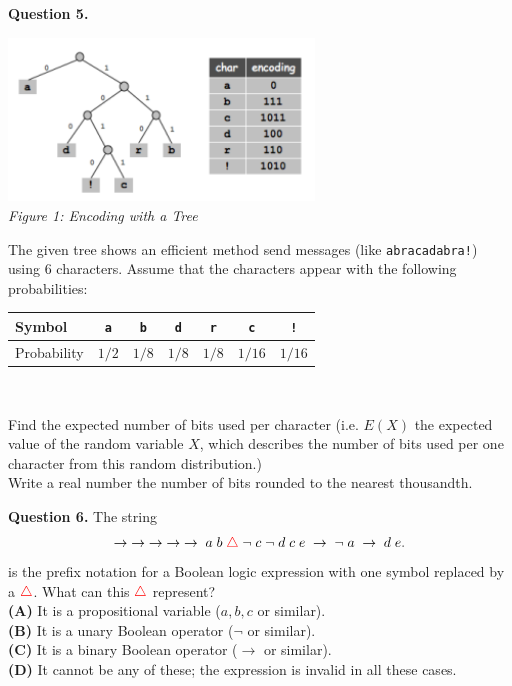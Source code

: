 \documentclass[jou]{apa6}
\begin{document}
\vspace{10pt}
{\bf Question 5.}
\begin{center}
\includegraphics[width=3.2in]{huffman-tree.png}\\
{\em Figure 1: Encoding with a Tree}
\end{center}
The given tree shows an efficient method send messages
(like {\tt abracadabra!}) using $6$ characters.
Assume that the characters appear with the following probabilities:\\
{\small
\begin{tabular}{|l|c|c|c|c|c|c|} \hline
Symbol & {\tt a} & {\tt b} & {\tt d} & {\tt r} & {\tt c} & {\tt !} \\ \hline
Probability &  $1/2$ & $1/8$ & $1/8$ & $1/8$ & $1/16$ & $1/16$ \\ \hline
\end{tabular}\\
}
Find the expected number of bits used per character (i.e. $E(X)$ \textendash{} the expected value of
the random variable $X$, which describes the number of bits used per one
character from this random distribution.)\\
Write a real number \textendash{} the number of bits rounded to the nearest thousandth.




 
 


\vspace{10pt}
{\bf Question 6.} 
The string
$$\rightarrow\;\rightarrow\;\rightarrow\;\rightarrow\;\rightarrow\;a\;b\;\textcolor{red}{\triangle}\;\neg\;c\;\neg\;d\;c\;e\;\rightarrow\;\neg\;a\;\rightarrow\;d\;e.$$
is the prefix notation for a Boolean logic expression with one symbol replaced by a $\textcolor{red}{\triangle}$. 
What can this $\textcolor{red}{\triangle}$ represent?\\
{\bf (A)} It is a propositional variable ($a,b,c$ or similar).\\
{\bf (B)} It is a unary Boolean operator ($\neg$ or similar).\\
{\bf (C)} It is a binary Boolean operator ($\rightarrow$ or similar).\\
{\bf (D)} It cannot be any of these; the expression is invalid in all these cases.
\end{document}
